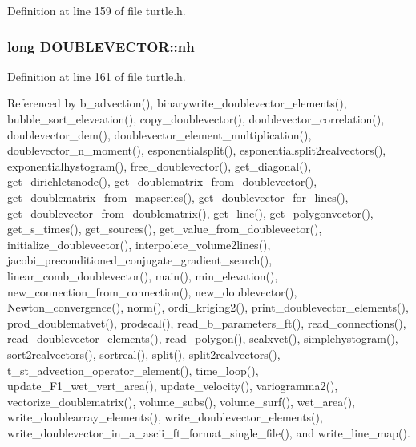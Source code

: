 Definition at line 159 of file turtle.\-h.

\hypertarget{struct_d_o_u_b_l_e_v_e_c_t_o_r_ab4b5a73bacbe4a88ccc31d8666826756}{
\subsubsection[{nh}]{\setlength{\rightskip}{0pt plus 5cm}long D\-O\-U\-B\-L\-E\-V\-E\-C\-T\-O\-R\-::nh}}\label{struct_d_o_u_b_l_e_v_e_c_t_o_r_ab4b5a73bacbe4a88ccc31d8666826756}


Definition at line 161 of file turtle.\-h.



Referenced by b\-\_\-advection(), binarywrite\-\_\-doublevector\-\_\-elements(), bubble\-\_\-sort\-\_\-eleveation(), copy\-\_\-doublevector(), doublevector\-\_\-correlation(), doublevector\-\_\-dem(), doublevector\-\_\-element\-\_\-multiplication(), doublevector\-\_\-n\-\_\-moment(), esponentialsplit(), esponentialsplit2realvectors(), exponentialhystogram(), free\-\_\-doublevector(), get\-\_\-diagonal(), get\-\_\-dirichletsnode(), get\-\_\-doublematrix\-\_\-from\-\_\-doublevector(), get\-\_\-doublematrix\-\_\-from\-\_\-mapseries(), get\-\_\-doublevector\-\_\-for\-\_\-lines(), get\-\_\-doublevector\-\_\-from\-\_\-doublematrix(), get\-\_\-line(), get\-\_\-polygonvector(), get\-\_\-s\-\_\-times(), get\-\_\-sources(), get\-\_\-value\-\_\-from\-\_\-doublevector(), initialize\-\_\-doublevector(), interpolete\-\_\-volume2lines(), jacobi\-\_\-preconditioned\-\_\-conjugate\-\_\-gradient\-\_\-search(), linear\-\_\-comb\-\_\-doublevector(), main(), min\-\_\-elevation(), new\-\_\-connection\-\_\-from\-\_\-connection(), new\-\_\-doublevector(), Newton\-\_\-convergence(), norm(), ordi\-\_\-kriging2(), print\-\_\-doublevector\-\_\-elements(), prod\-\_\-doublematvet(), prodscal(), read\-\_\-b\-\_\-parameters\-\_\-ft(), read\-\_\-connections(), read\-\_\-doublevector\-\_\-elements(), read\-\_\-polygon(), scalxvet(), simplehystogram(), sort2realvectors(), sortreal(), split(), split2realvectors(), t\-\_\-st\-\_\-advection\-\_\-operator\-\_\-element(), time\-\_\-loop(), update\-\_\-\-F1\-\_\-wet\-\_\-vert\-\_\-area(), update\-\_\-velocity(), variogramma2(), vectorize\-\_\-doublematrix(), volume\-\_\-subs(), volume\-\_\-surf(), wet\-\_\-area(), write\-\_\-doublearray\-\_\-elements(), write\-\_\-doublevector\-\_\-elements(), write\-\_\-doublevector\-\_\-in\-\_\-a\-\_\-ascii\-\_\-ft\-\_\-format\-\_\-single\-\_\-file(), and write\-\_\-line\-\_\-map().

